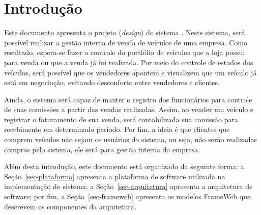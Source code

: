 \chapter{Introdução}
\label{sec-intro}
\vspace{-1cm}

Este documento apresenta o projeto (\textit{design}) do sistema \emph{\imprimirtitulo}. Neste sistema, será possível realizar a gestão interna de venda de veículos de uma empresa. Como resultado, espera-se fazer o controle do portfólio de veículos que a loja possui para venda ou que a venda já foi realizada. Por meio do controle de estados dos veículos, será possível que os vendedores apontem e visualizem que um veículo já está em negociação, evitando desconforto entre vendedores e clientes.

Ainda, o sistema será capaz de manter o registro dos funcionários para controle de suas comissões a partir das vendas realizadas. Assim, ao vender um veículo e registrar o faturamento de sua venda, será contabilizada sua comissão para recebimento em determinado período. Por fim, a ideia é que clientes que comprem veículos não sejam os usuários do sistema, ou seja, não serão realizadas compras pelo sistema, ele será para gestão interna da empresa.

Além desta introdução, este documento está organizado da seguinte forma: 
a Seção~\ref{sec-plataforma} apresenta a plataforma de software utilizada na implementação do sistema;
a Seção~\ref{sec-arquitetura} apresenta a arquitetura de software; por fim, 
a Seção~\ref{sec-frameweb} apresenta os modelos FrameWeb que descrevem os componentes da arquitetura.

